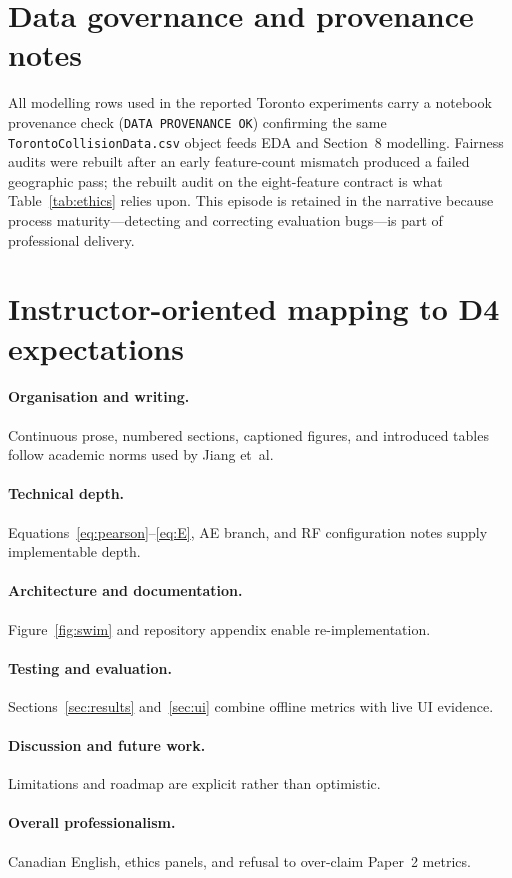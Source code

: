 \documentclass[11pt,a4paper]{article}
\begin{document}
\newpage
\section*{Data governance and provenance notes}
\label{sec:gov}
All modelling rows used in the reported Toronto experiments carry a notebook provenance check (\texttt{DATA PROVENANCE OK}) confirming the same \texttt{TorontoCollisionData.csv} object feeds EDA and Section~8 modelling. Fairness audits were rebuilt after an early feature-count mismatch produced a failed geographic pass; the rebuilt audit on the eight-feature contract is what Table~\ref{tab:ethics} relies upon. This episode is retained in the narrative because process maturity---detecting and correcting evaluation bugs---is part of professional delivery.

\newpage
\section*{Instructor-oriented mapping to D4 expectations}
\label{sec:instructor}
\paragraph{Organisation and writing.} Continuous prose, numbered sections, captioned figures, and introduced tables follow academic norms used by Jiang et~al.
\paragraph{Technical depth.} Equations~\eqref{eq:pearson}--\eqref{eq:E}, AE branch, and RF configuration notes supply implementable depth.
\paragraph{Architecture and documentation.} Figure~\ref{fig:swim} and repository appendix enable re-implementation.
\paragraph{Testing and evaluation.} Sections~\ref{sec:results} and~\ref{sec:ui} combine offline metrics with live UI evidence.
\paragraph{Discussion and future work.} Limitations and roadmap are explicit rather than optimistic.
\paragraph{Overall professionalism.} Canadian English, ethics panels, and refusal to over-claim Paper~2 metrics.
\end{document}
